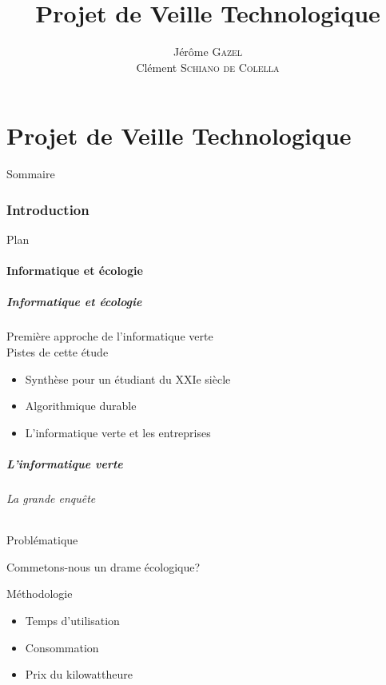 \documentclass[slidetop,11pt]{beamer}
\title{Projet de Veille Technologique}
\author{Jérôme \textsc{Gazel} \\ Clément \textsc{Schiano de Colella}}
\institute{\'Ecole Centrale de Nantes}
\date{\oldstylenums{mardi 15 mars 2011}}
\begin{document}
\frame{\titlepage}
%
\part{Projet de Veille Technologique} 
\begin{frame}{Sommaire}
  \small \tableofcontents[hideallsubsections]
\end{frame} 


\section{Introduction}
\begin{frame}{Plan}
  \tableofcontents[sections=\thesection]
\end{frame}
\subsection{Informatique et écologie}
\begin{frame}[label=pagesimple]
  \frametitle{Informatique et écologie}
  Première approche de l'informatique verte\\
  Pistes de cette étude
  \begin{itemize}[<+->]
    \item Synthèse pour un étudiant du XXIe siècle
    \item Algorithmique durable
    \item L'informatique verte et les entreprises
    \end{itemize}
  \bigskip
\end{frame}

\begin{frame} 
  \frametitle{L'informatique verte}
  \framesubtitle{La grande enquête}
  \begin{block}{Problématique}
    \begin{center}
        Commetons-nous un drame écologique?
    \end{center}
  \end{block}   
  \begin{block}{Méthodologie}
     \begin{itemize}[<+->]
         \item Temps d'utilisation
         \item Consommation
         \item Prix du kilowattheure
     \end{itemize}
  \end{block}   
\end{frame}
\end{document}
